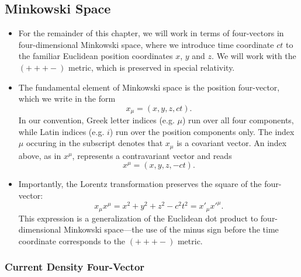 \documentclass[11pt, a4paper]{article}
\begin{document}
\subsection{Minkowski Space}
\begin{itemize}
    \item For the remainder of this chapter, we will work in terms of four-vectors in four-dimensional Minkowski space, where we introduce time coordinate $ ct $ to the familiar Euclidean position coordinates $ x $, $ y $ and $ z $. We will work with the $ (+++-) $ metric, which is preserved in special relativity.

	\item The fundamental element of Minkowski space is the position four-vector, which we write in the form
	\begin{equation*}
		x_{\mu} = (x, y, z, ct).
	\end{equation*}
    In our convention, Greek letter indices (e.g. $ \mu $) run over all four components, while Latin indices (e.g. $ i $) run over the position components only. The index $ \mu $ occuring in the subscript denotes that $ x_{\mu} $ is a covariant vector. An index above, as in $ x^{\mu} $, represents a contravariant vector and reads
	\begin{equation*}
		x^{\mu} = (x, y, z, -ct).
	\end{equation*}

	\item Importantly, the Lorentz transformation preserves the square of the four-vector:
	\begin{equation*}
		x_{\mu}x^{\mu} = x^{2} + y^{2} + z^{2} - c^{2}t^{2} = x'_{\mu} x'^{\mu}.
	\end{equation*}
    This expression is a generalization of the Euclidean dot product to four-dimensional Minkowski space---the use of the minus sign before the time coordinate corresponds to the $ (+++-) $ metric.

\end{itemize}

\subsubsection{Current Density Four-Vector}
\end{document}
